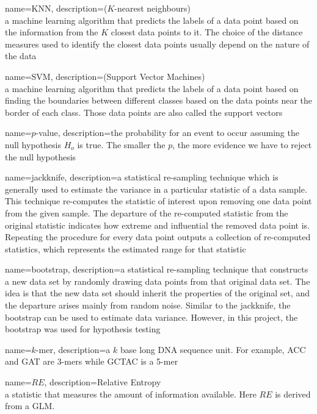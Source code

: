 {
        name=KNN,
        description={($K$-nearest neighbours) \\ a machine learning algorithm that predicts the labels of a data point based on the information from the $K$ closest data points to it. The choice of the distance measures used to identify the closest data points usually depend on the nature of the data}
}

{
        name=SVM,
        description={(Support Vector Machines) \\ a machine learning algorithm that predicts the labels of a data point based on finding the boundaries between different classes based on the data points near the border of each class. Those data points are also called the support vectors}
}

{
        name=$p$-value,
        description={the probability for an event to occur assuming the null hypothesis $H_o$ is true. The smaller the $p$, the more evidence we have to reject the null hypothesis}
}

{
        name=jackknife,
        description={a statistical re-sampling technique which is generally used to estimate the variance in a particular statistic of a data sample. This technique re-computes the statistic of interest upon removing one data point from the given sample. The departure of the re-computed statistic from the original statistic indicates how extreme and influential the removed data point is. Repeating the procedure for every data point outputs a collection of re-computed statistics, which represents the estimated range for that statistic}
}

{
        name=bootstrap,
        description={a statistical re-sampling technique that constructs a new data set by randomly drawing data points from that original data set. The idea is that the new data set should inherit the properties of the original set, and the departure arises mainly from random noise. Similar to the jackknife, the bootstrap can be used to estimate data variance. However, in this project, the bootstrap was used for hypothesis testing}
}

{
        name=$k$-mer,
        description={a $k$ base long DNA sequence unit. For example, ACC and GAT are 3-mers while GCTAC is a 5-mer}
}

{
        name=$RE$,
        description={Relative Entropy \\
        a statistic that measures the amount of information available. Here $RE$ is derived from a GLM.}
}

